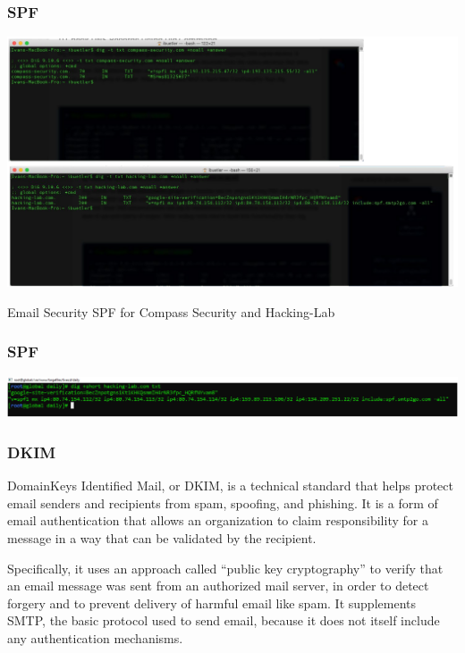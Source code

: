 \subsubsection{SPF}
\begin{table}[h]
  \centering
  \includegraphics[width=\textwidth]{resources/12-email-security-spf.png}
  \caption{Email Security SPF for Compass Security and Hacking-Lab}
\end{table}

\subsubsection{SPF}
\begin{table}[h]
  \centering
  \includegraphics[width=\textwidth]{resources/12-email-security-spf-2.png}
\end{table}





\subsubsection{DKIM}
DomainKeys Identified Mail, or DKIM, is a technical standard that helps protect email senders and recipients from spam, spoofing, and phishing. It is a form of email authentication that allows an organization to claim responsibility for a message in a way that can be validated by the recipient.

Specifically, it uses an approach called “public key cryptography” to verify that an email message was sent from an authorized mail server, in order to detect forgery and to prevent delivery of harmful email like spam. It supplements SMTP, the basic protocol used to send email, because it does not itself include any authentication mechanisms.


